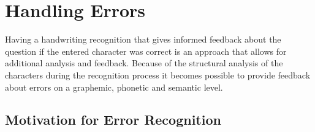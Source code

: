 







\section{Handling Errors}
\label{sec:concept:handlingerrors}

Having a handwriting recognition that gives informed feedback about the 
question if the entered character was correct is an approach that allows
for additional analysis and feedback.
Because of the structural analysis of the characters during the recognition 
process it becomes possible to provide feedback about errors on a graphemic, 
phonetic and semantic level.



\subsection{Motivation for Error Recognition}
\label{sec:concept:motivationforerrorrecognition}

